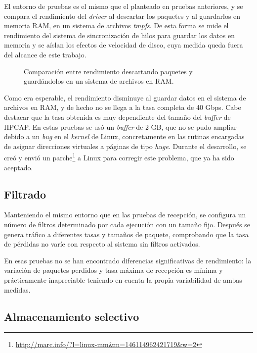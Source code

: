 \documentclass[twoside, 12pt]{epstfg}
\begin{document}
El entorno de pruebas es el mismo que el planteado en pruebas anteriores, y se compara el rendimiento del \textit{driver} al descartar los paquetes y al guardarlos en memoria RAM, en un sistema de archivos \textit{tmpfs}. De esta forma se mide el rendimiento del sistema de sincronización de hilos para guardar los datos en memoria y se aíslan los efectos de velocidad de disco, cuya medida queda fuera del alcance de este trabajo.

\begin{figure}[hbtp]
\caption{Comparación entre rendimiento descartando paquetes y guardándolos en un sistema de archivos en RAM.}
\label{fig:Validacion:DiskStore}
\end{figure}

Como era esperable, el rendimiento disminuye al guardar datos en el sistema de archivos en RAM, y de hecho no se llega a la tasa completa de 40 Gbps. Cabe destacar que la tasa obtenida es muy dependiente del tamaño del \textit{buffer} de HPCAP. En estas pruebas se usó un \textit{buffer} de 2 GB, que no se pudo ampliar debido a un \textit{bug} en el \textit{kernel} de Linux, concretamente en las rutinas encargadas de asignar direcciones virtuales a páginas de tipo \textit{huge}. Durante el desarrollo, se creó y envió un parche\footnote{\url{http://marc.info/?l=linux-mm&m=146114962421719&w=2}} a Linux para corregir este problema, que ya ha sido aceptado.

\subsection{Filtrado}

Manteniendo el mismo entorno que en las pruebas de recepción, se configura un número de filtros determinado por cada ejecución con un tamaño fijo. Después se genera tráfico a diferentes tasas y tamaños de paquete, comprobando que la tasa de pérdidas no varíe con respecto al sistema sin filtros activados.

En esas pruebas no se han encontrado diferencias significativas de rendimiento: la variación de paquetes perdidos y tasa máxima de recepción es mínima y prácticamente inapreciable teniendo en cuenta la propia variabilidad de ambas medidas.

\subsection{Almacenamiento selectivo}
\end{document}
